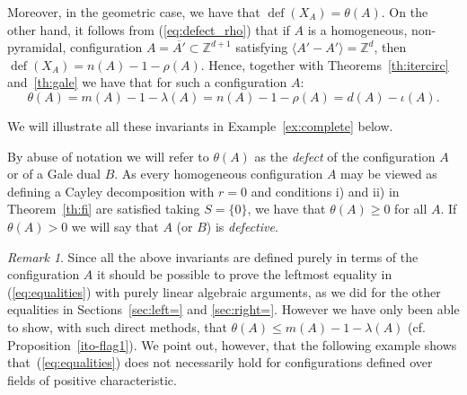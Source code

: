 \documentclass[11pt]{amsart}
\theoremstyle{plain}
\theoremstyle{definition}
\newcounter{remarks}
\theoremstyle{remark}
\newtheorem{remark}[remarks]{Remark}
\newcommand{\defect}{{\operatorname {def}}}
\newcommand{\baseRing}[1]{\ensuremath{\mathbb{#1}}}
\newcommand{\Z}{\baseRing{Z}}
\newcommand{\beq}{\begin{equation}}
\newcommand{\eeq}{\end{equation}}
\numberwithin{equation}{section}
\begin{document}
Moreover, in the geometric case, we have that $\defect(X_A) = \theta(A)$.
On the other hand, it follows from (\ref{eq:defect_rho}) that if $A$  is a homogeneous, non-pyramidal, configuration 
$A= \overline{A'}\subset  \Z^{d+1}$ satisfying $\langle A' - A' \rangle = \Z^d$, then
$\defect(X_A) = n(A) - 1 - \rho(A)$.  Hence, together with 
Theorems~\ref{th:itercirc} and~\ref{th:gale} we have that for such a configuration $A$:
\beq\label{eq:equalities}
\theta(A) = m(A) - 1 - \lambda(A) = n(A) - 1 - \rho(A) = d(A) -\iota(A).
\eeq

We will illustrate all these invariants in Example~\ref{ex:complete} below.
  
By abuse of notation we will refer to $\theta(A)$ as the {\em defect} of the configuration $A$ or of a Gale dual $B$. 
As every homogeneous configuration $A$ may be viewed as defining 
a Cayley decomposition with $r=0$ and conditions i) and ii) in Theorem~\ref{th:fi} are satisfied taking $S=\{0\}$, we have that
$\theta(A) \ge 0$ for all $A$. 
If $\theta(A)>0$ we will say that $A$ (or $B$) is {\em defective}.


\begin{remark}\label{rem:3}
Since all the above invariants are defined purely in terms of the configuration $A$ it should be possible to prove the leftmost equality in (\ref{eq:equalities}) 
with purely linear algebraic arguments, as we did for the other equalities in Sections~\ref{sec:left=} and \ref{sec:right=}. 
 However we have only been able to show, with such direct methods, that 
$\theta(A) \leq m(A) - 1 - \lambda(A)$ (cf. Proposition~\ref{ito-flag1}).  We point out, however, 
that the following example shows that~(\ref{eq:equalities}) 
does not necessarily hold for configurations defined over fields of positive characteristic.
\end{remark}
\end{document}
